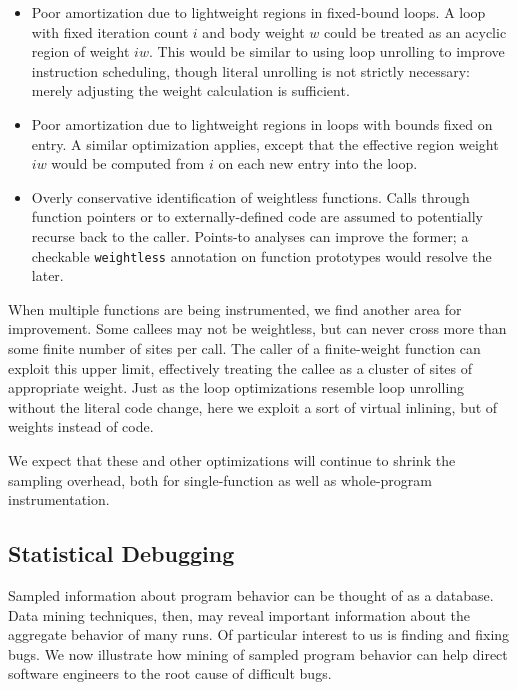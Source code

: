 \begin{itemize}
\item Poor amortization due to lightweight regions in fixed-bound
  loops.  A loop with fixed iteration count $i$ and body weight $w$
  could be treated as an acyclic region of weight $iw$.  This would be
  similar to using loop unrolling to improve instruction scheduling,
  though literal unrolling is not strictly necessary: merely adjusting
  the weight calculation is sufficient.
  
\item Poor amortization due to lightweight regions in loops with
  bounds fixed on entry.  A similar optimization applies, except that
  the effective region weight $iw$ would be computed from $i$ on each
  new entry into the loop.
  
\item Overly conservative identification of weightless functions.
  Calls through function pointers or to externally-defined code are
  assumed to potentially recurse back to the caller.  Points-to
  analyses can improve the former; a checkable \texttt{weightless}
  annotation on function prototypes would resolve the later.
\end{itemize}

When multiple functions are being instrumented, we find another area
for improvement.  Some callees may not be weightless, but can never
cross more than some finite number of sites per call.  The caller of a
finite-weight function can exploit this upper limit, effectively
treating the callee as a cluster of sites of appropriate weight.  Just
as the loop optimizations resemble loop unrolling without the literal
code change, here we exploit a sort of virtual inlining, but of
weights instead of code.

We expect that these and other optimizations will continue to shrink
the sampling overhead, both for single-function as well as
whole-program instrumentation.

\subsection{Statistical Debugging}
\label{sec:applications:mining}

Sampled information about program behavior can be thought of as a
database.  Data mining techniques, then, may reveal important
information about the aggregate behavior of many runs.  Of particular
interest to us is finding and fixing bugs.  We now illustrate how
mining of sampled program behavior can help direct software engineers
to the root cause of difficult bugs.

